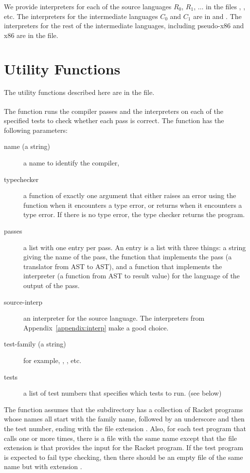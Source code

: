\documentclass[11pt]{book}
\begin{document}
We provide interpreters for each of the source languages $R_0$, $R_1$,
$\ldots$ in the files , , etc.
The interpreters for the intermediate languages $C_0$ and $C_1$ are in
 and .  The interpreters for
the rest of the intermediate languages, including pseudo-x86 and x86
are in the  file.

\section{Utility Functions}
\label{appendix:utilities}

The utility functions described here are in the 
file.

\paragraph{}

The  function runs the compiler passes and the
interpreters on each of the specified tests to check whether each pass
is correct. The  function has the following
parameters:
\begin{description}
\item[name (a string)] a name to identify the compiler,
\item[typechecker] a function of exactly one argument that either
  raises an error using the  function when it encounters a
  type error, or returns  when it encounters a type
  error. If there is no type error, the type checker returns the
  program.

\item[passes] a list with one entry per pass.  An entry is a list with
  three things: a string giving the name of the pass, the function
  that implements the pass (a translator from AST to AST), and a
  function that implements the interpreter (a function from AST to
  result value) for the language of the output of the pass.

\item[source-interp] an interpreter for the source language. The
  interpreters from Appendix~\ref{appendix:interp} make a good choice.
  
\item[test-family (a string)] for example, , , etc.
\item[tests] a list of test numbers that specifies which tests to
  run. (see below)
\end{description}
%
The  function assumes that the subdirectory
 has a collection of Racket programs whose names all start
with the family name, followed by an underscore and then the test
number, ending with the file extension . Also, for each test
program that calls  one or more times, there is a file with
the same name except that the file extension is  that
provides the input for the Racket program. If the test program is
expected to fail type checking, then there should be an empty file of
the same name but with extension .
\end{document}
